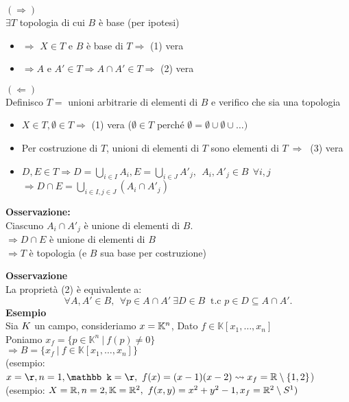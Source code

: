 \documentclass{article}
\begin{document}
\begin{dimo}
	$( \Rightarrow )$ \\
	$\exists T$ topologia di cui $B$ è base (per ipotesi)\\
	\begin{itemize}
		\item $ \Rightarrow $ $X\in T$ e $B$ è base di $T \Rightarrow $ (1) vera
\item $ \Rightarrow A$ e $A'\in T \Rightarrow A\cap A'\in T \Rightarrow $ (2) vera
	\end{itemize}
	$ ( \Leftarrow )$ \\
	Definisco $T = $ unioni arbitrarie di elementi di $B$ e verifico che sia una topologia
	\begin{itemize}
		\item $X\in T, \emptyset\in T \Rightarrow $ (1) vera ($\emptyset\in T$ perché $\emptyset = \emptyset\cup\emptyset\cup\ldots )$
		\item Per costruzione di  $T$, unioni di elementi di $T$ sono elementi di $T\ \Rightarrow \ $ (3) vera
		\item $D,E\in T \Rightarrow D = \bigcup_{i\in I} A_i, E = \bigcup_{i\in J}A'_j, \ \ A_i,A'_j\in B \  \ \forall i,j$ \\
			$ \Rightarrow D\cap E = \bigcup^{}_{i\in I, j\in J}(A_i\cap A'_j)$
	\end{itemize}
	\textbf{Osservazione:}\\
	Ciascuno $A_i\cap A'_j$ è unione di elementi di $B.$ \\
	$ \Rightarrow D\cap E$ è unione di elementi di $B$\\
	 $ \Rightarrow T $ è topologia (e $B$ sua base per costruzione)
\end{dimo}
\textbf{Osservazione}\\
La proprietà (2) è equivalente a:
\[
	\forall A,A'\in B, \ \ \forall p\in A\cap A' \ \exists D\in B \ \text{ t.c } p\in D\subseteq A\cap A'
.\] 
\textbf{Esempio}\\
Sia $\mathbb \mathbb{K}$ un campo, consideriamo $x = \mathbb {\mathbb{K}}^n$, Dato  $f\in \mathbb K[x_1,\ldots,x_n]$\\
Poniamo $x_f = \{p\in\mathbb K^n \ | \ f(p)\neq 0\}$\\
$ \Rightarrow  B = \{x_f \ | \ f\in \mathbb K[x_1,\ldots,x_n]\}$ \\
(esempio: $x = \r, n = 1, \mathbb k = \r, \ f(x) = (x-1)(x-2) \leadsto x_f= \R\setminus\{1,2\}$)
(esempio: $X = \mathbb{R}, n = 2, \mathbb K = \mathbb{R}^2, \ f(x,y) = x^2 + y^2 - 1, x_f = \mathbb{R}^2\setminus S^1)\\$
\end{document}
